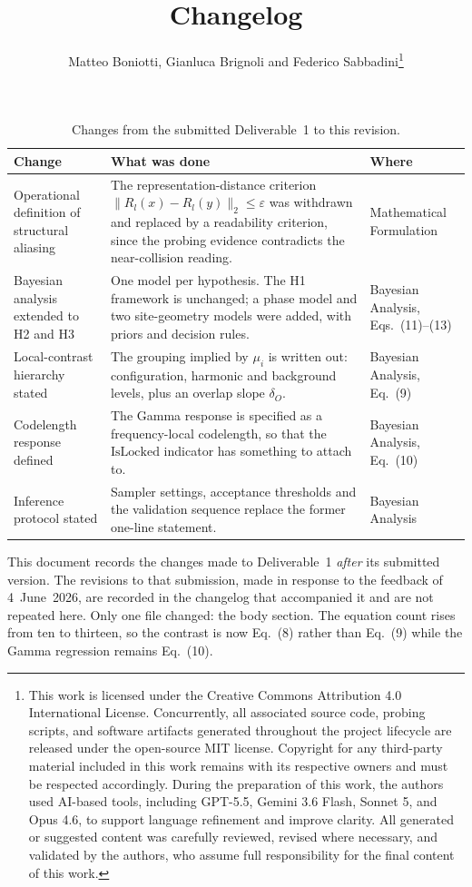 \documentclass[
	letterpaper, %
	10pt, %
	unnumberedsections, %
	twoside, %
]{LTJournalArticle}
\title{Changelog} %
\author{
	Matteo Boniotti, Gianluca Brignoli and Federico Sabbadini\thanks{This work is licensed under the Creative Commons Attribution 4.0 International License. Concurrently, all associated source code, probing scripts, and software artifacts generated throughout the project lifecycle are released under the open-source MIT license. \newline Copyright for any third-party material included in this work remains with its respective owners and must be respected accordingly. \newline \newline During the preparation of this work, the authors used AI-based tools, including GPT-5.5, Gemini 3.6 Flash, Sonnet 5, and Opus 4.6, to support language refinement and improve clarity. All generated or suggested content was carefully reviewed, revised where necessary, and validated by the authors, who assume full responsibility for the final content of this work.}
}
\renewcommand{\arraystretch}{1.75}
\begin{document}
 
\maketitle %
 
\begin{table}[!b]
\centering
\small
\renewcommand{\arraystretch}{1.4}
\begin{tabular}{@{} m{4.2cm} m{7.6cm} m{2.8cm} @{}}
\toprule
\textbf{Change} & \textbf{What was done} & \textbf{Where} \\
\midrule
Operational definition of structural aliasing
  & The representation-distance criterion $\lVert R_l(x)-R_l(y)\rVert_2\le\varepsilon$ was
    withdrawn and replaced by a readability criterion, since the probing evidence contradicts
    the near-collision reading.
  & Mathematical Formulation \\
\hline
Bayesian analysis extended to H2 and H3
  & One model per hypothesis. The H1 framework is unchanged; a phase model and two
    site-geometry models were added, with priors and decision rules.
  & Bayesian Analysis, Eqs.~(11)--(13) \\
\hline
Local-contrast hierarchy stated
  & The grouping implied by $\mu_i$ is written out: configuration, harmonic and background
    levels, plus an overlap slope $\delta_O$.
  & Bayesian Analysis, Eq.~(9) \\
\hline
Codelength response defined
  & The Gamma response is specified as a frequency-local codelength, so that the
    $\text{IsLocked}$ indicator has something to attach to.
  & Bayesian Analysis, Eq.~(10) \\
\hline
Inference protocol stated
  & Sampler settings, acceptance thresholds and the validation sequence replace the former
    one-line statement.
  & Bayesian Analysis \\
\bottomrule
\end{tabular}
\caption{Changes from the submitted Deliverable~1 to this revision.}
\label{tab:changelog}
\end{table}

This document records the changes made to Deliverable~1 \emph{after} its submitted version. The
revisions to that submission, made in response to the feedback of 4~June~2026, are recorded in the
changelog that accompanied it and are not repeated here. Only one file changed: the body section.
The equation count rises from ten to thirteen, so the contrast is now Eq.~(8) rather than Eq.~(9)
while the Gamma regression remains Eq.~(10).
\end{document}
